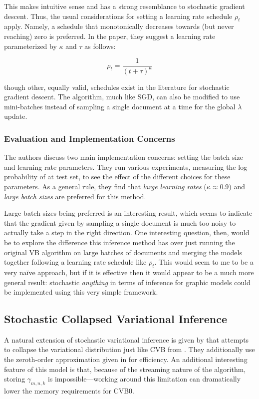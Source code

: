 \documentclass[11pt]{article}
\begin{document}
This makes intuitive sense and has a strong resemblance to stochastic
gradient descent. Thus, the usual considerations for setting a learning
rate schedule $\rho_t$ apply. Namely, a schedule that monotonically
decreases towards (but never reaching) zero is preferred. In the paper,
they suggest a learning rate parameterized by $\kappa$ and $\tau$ as
follows:

\begin{equation}
  \rho_t = \frac{1}{(t+\tau)^\kappa}
\end{equation}

though other, equally valid, schedules exist in the literature for
stochastic gradient descent. The algorithm, much like SGD, can also be
modified to use mini-batches instead of sampling a single document at a
time for the global $\lambda$ update.

\subsubsection{Evaluation and Implementation Concerns}

The authors discuss two main implementation concerns: setting the batch
size and learning rate parameters. They run various experiments, measuring
the log probability of at test set, to see the effect of the different
choices for these parameters. As a general rule, they find that \emph{large
learning rates} ($\kappa \approx 0.9$) and \emph{large batch sizes} are
preferred for this method.

Large batch sizes being preferred is an interesting result, which seems to
indicate that the gradient given by sampling a single document is much too
noisy to actually take a step in the right direction. One interesting
question, then, would be to explore the difference this inference method
has over just running the original VB algorithm on large batches of
documents and merging the models together following a learning rate
schedule like $\rho_t$. This would seem to me to be a very na\"ive
approach, but if it is effective then it would appear to be a much more
general result: stochastic \emph{anything} in terms of inference for
graphic models could be implemented using this very simple framework.

\subsection{Stochastic Collapsed Variational Inference}
A natural extension of stochastic variational inference is given by
\citet{Foulds:2013:scvb} that attempts to collapse the variational
distribution just like CVB from \citet{Teh:2007:CVB}. They additionally use
the zeroth-order approximation given in \citet{Asuncion:2009:onsmoothing}
for efficiency. An additional interesting feature of this model is that,
because of the streaming nature of the algorithm, storing $\gamma_{m,n,k}$
is impossible---working around this limitation can dramatically lower the
memory requirements for CVB0.
\end{document}
